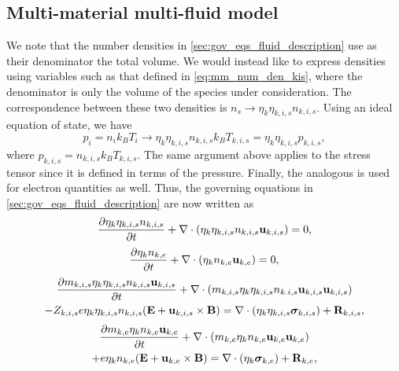 \documentclass[a4paper,11pt]{report}
\begin{document}
\subsection{Multi-material multi-fluid model}
We note that the number densities in \cref{sec:gov_eqs_fluid_description} use as their denominator the total volume. We would instead like to express densities using variables such as that defined in \cref{eq:mm_num_den_kis}, where the denominator is only the volume of the species under consideration. The correspondence between these two densities is $n_s \to \eta_k \eta_{k,i,s} n_{k,i,s}$. Using an ideal equation of state, we have
\begin{equation}
    p_i = n_i k_B T_i \to \eta_k \eta_{k,i,s} n_{k,i,s} k_B T_{k,i,s} = \eta_k \eta_{k,i,s} p_{k,i,s},
\end{equation}
where $p_{k,i,s} = n_{k,i,s} k_B T_{k,i,s}$. The same argument above applies to the stress tensor since it is defined in terms of the pressure. Finally, the analogous is used for electron quantities as well. Thus, the governing equations in \cref{sec:gov_eqs_fluid_description} are now written as
\begin{equation}
    \label{eq:mf_mm_ni}
    \frac{\partial \eta_k \eta_{k,i,s} n_{k,i,s}}{\partial t} + \nabla \cdot \left ( \eta_k \eta_{k,i,s} n_{k,i,s} \mathbf{u}_{k,i,s} \right ) = 0,
\end{equation}
\begin{equation}
    \label{eq:mf_mm_ne}
    \frac{\partial \eta_k n_{k,e}}{\partial t} + \nabla \cdot \left ( \eta_k n_{k,e} \mathbf{u}_{k,e} \right ) = 0,
\end{equation}
\begin{multline}
    \label{eq:mf_mm_ui}
    \frac{\partial m_{k,i,s} \eta_k \eta_{k,i,s} n_{k,i,s} \mathbf{u}_{k,i,s}}{\partial t} + \nabla \cdot \left( m_{k,i,s} \eta_k \eta_{k,i,s} n_{k.i,s} \mathbf{u}_{k,i,s} \mathbf{u}_{k,i,s} \right) \\
    - Z_{k,i,s} e \eta_k \eta_{k,i,s} n_{k,i,s} ( \mathbf{E} + \mathbf{u}_{k,i,s} \times \mathbf{B} ) = \nabla \cdot \left( \eta_k \eta_{k,i,s} \bm \sigma_{k,i,s} \right) + \mathbf{R}_{k,i,s},
\end{multline}
\begin{multline}
    \label{eq:mf_mm_ue}
    \frac{\partial m_{k,e} \eta_k n_{k,e} \mathbf{u}_{k,e}}{\partial t} + \nabla \cdot \left( m_{k,e} \eta_k n_{k,e} \mathbf{u}_{k,e} \mathbf{u}_{k,e} \right) \\
    + e \eta_k n_{k,e} ( \mathbf{E} + \mathbf{u}_{k,e} \times \mathbf{B} ) = \nabla \cdot \left( \eta_k \bm \sigma_{k,e} \right) + \mathbf{R}_{k,e},
\end{multline}
\end{document}
